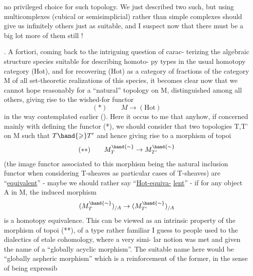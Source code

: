 no privileged choice for such topology.  We just described two such,
but using  multicomplexes (cubical or semisimplicial) rather than
\margin{[$\uparrow$}simple complexes should give us infinitely  others  just as suitable,
and I suspect  now that there must be a big lot more of them still !

\margin{[$\downarrow$}.  A fortiori,  coming back to the intriguing question of  carac-%
terizing the algebraic structure species suitable for describing homoto-%
py types in the usual homotopy category (Hot),   and for
recovering (Hot) as a category of fractions of the category M of all
set-theoretic realizations of this species,  it becomes clear now that
we cannot hope reasonably for a ``natural'' topology on M,  distinguished
among all others,  giving rise to the wished-for functor
\[ (*) \qquad M \to (\mathrm{Hot}) \]
in the way contemplated earlier ().  Here it occus to me
that anyhow,  if concerned mainly with defining the functor (*),  we
should consider that two topologies T,T' on M such that $T \hand{\geqslant} T'$  and
hence giving rise to a morphism of topoi
\[ (**) \qquad M_T^{\hand{\sim}} \to M_{T'}^{\hand{\sim}} \]
(the  image functor associated to this morphism being the natural
inclusion functor\hand{,} when considering T-sheaves as particular cases of
T-sheaves) are ``\uline{equivalent}''  -  maybe we should rather say ``\uline{Hot-equiva-}%
\uline{lent}'' -  if for any  object A in M,  the induced morphism
\[ (M_T^{\hand{\sim}})_{/A} \to (M_{T'}^{\hand{\sim}})_{/A} \]
is a homotopy equivalence.  This can be viewed as an intrinsic property
of the morphism of topoi (**), of a type rather familiar I guess to
people used to the dialectics of \hand{\'{}}etale cohomology,  where a very simi-%
lar notion was met and given the name of a ``globally acyclic morphism''.
The suitable name here would be ``globally aspheric morphism''
which is a reinforcement of the former,  in the sense of being expressib%

